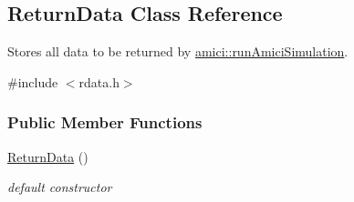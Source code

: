 \hypertarget{classamici_1_1_return_data}{}\subsection{Return\+Data Class Reference}
\label{classamici_1_1_return_data}


Stores all data to be returned by \mbox{\hyperlink{namespaceamici_a025192a6f53e19eae958cd3b14786f80}{amici\+::run\+Amici\+Simulation}}.  




{\ttfamily \#include $<$rdata.\+h$>$}

\subsubsection*{Public Member Functions}
\begin{DoxyCompactItemize}
\item 
\mbox{\label{classamici_1_1_return_data_a4ce4db6c8f0e0ac9f21f708d042c30e5}} 
\mbox{\hyperlink{classamici_1_1_return_data_a4ce4db6c8f0e0ac9f21f708d042c30e5}{Return\+Data}} ()
\begin{DoxyCompactList}\small\item\em default constructor \end{DoxyCompactList}\item 

\end{DoxyCompactItemize}
